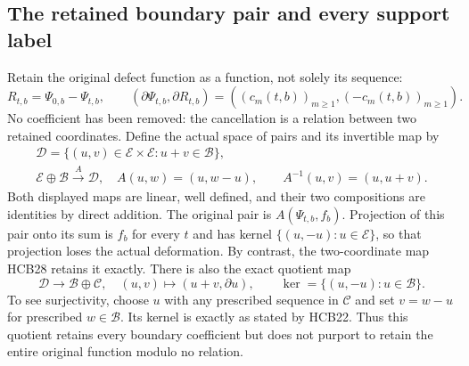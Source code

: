\subsection{The retained boundary pair and every support label}

Retain the original defect function as a function, not solely its
sequence:
\begin{equation}\tag{HCB27}
 R_{t,b}=\Psi_{0,b}-\Psi_{t,b},\qquad
 (\partial\Psi_{t,b},\partial R_{t,b})
       =((c_m(t,b))_{m\geq1},(-c_m(t,b))_{m\geq1}).
\end{equation}
No coefficient has been removed: the cancellation is a relation
between two retained coordinates. Define the actual space of
pairs and its invertible map by
\begin{equation}\tag{HCB28}
\begin{gathered}
 \mathcal D=\{(u,v)\in\mathcal E\times\mathcal E:u+v\in\mathcal B\},\\
 \mathcal E\oplus\mathcal B\xrightarrow{\ A\ }\mathcal D,
 \quad A(u,w)=(u,w-u),\qquad
 A^{-1}(u,v)=(u,u+v).
\end{gathered}
\end{equation}
Both displayed maps are linear, well defined, and their two
compositions are identities by direct addition. The original pair
is $A(\Psi_{t,b},f_b)$. Projection of this pair onto its sum is
$f_b$ for every $t$ and has kernel $\{(u,-u):u\in\mathcal E\}$,
so that projection loses the actual deformation. By contrast, the
two-coordinate map HCB28 retains it exactly. There is also the
exact quotient map
\begin{equation}\tag{HCB29}
 \mathcal D\longrightarrow\mathcal B\oplus\mathcal C,
 \quad(u,v)\longmapsto(u+v,\partial u),\qquad
 \ker=\{(u,-u):u\in\mathcal B\}.
\end{equation}
To see surjectivity, choose $u$ with any prescribed sequence in
$\mathcal C$ and set $v=w-u$ for prescribed $w\in\mathcal B$.
Its kernel is exactly as stated by HCB22. Thus this quotient
retains every boundary coefficient but does not purport to retain
the entire original function modulo no relation.


